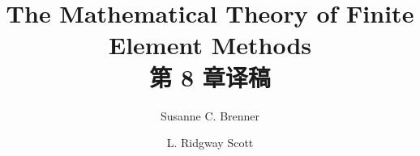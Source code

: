 \documentclass[a4paper,UTF8,12pt]{ctexart}
\title{The Mathematical Theory of Finite Element Methods\\第 8 章译稿}
\author{Susanne C. Brenner \and L. Ridgway Scott}
\date{}
\begin{document}
\maketitle
\setcounter{section}{7}
\renewcommand{\thethmcount}{\thesubsection.\arabic{thmcount}}
\renewcommand{\theequation}{\thesubsection.\arabic{equation}}
\renewcommand{\thefigure}{\thesection.\arabic{figure}}
\renewcommand{\thetable}{\thesection.\arabic{table}}

\end{document}
